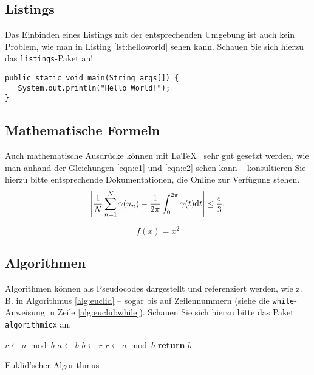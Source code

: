 \subsection{Listings}	

Das Einbinden eines Listings mit der entsprechenden Umgebung ist auch kein Problem, wie man in Listing \vref{lst:helloworld} sehen kann. Schauen Sie sich hierzu das \texttt{listings}-Paket an! 
		
		\newpage
		
		
\lstset{language=Java}
\begin{lstlisting}[caption={Hello World!}, label={lst:helloworld}]
public static void main(String args[]) {
   System.out.println("Hello World!");
}
\end{lstlisting}


\subsection{Mathematische Formeln}
Auch mathematische Ausdrücke können mit \LaTeX~ sehr gut gesetzt werden, wie man anhand der Gleichungen \vref{eqn:e1} und \vref{eqn:e2} sehen kann -- konsultieren Sie hierzu bitte entsprechende Dokumentationen, die Online zur Verfügung stehen.
\begin{equation}
\left|{1\over N}\sum_{n=1}^N \gamma(u_n)-{1\over 2\pi}\int_0^{2\pi}\gamma(t){\rm d}t\right| \le {\varepsilon\over 3}.\\
\label{eqn:e1}
\end{equation}

\begin{equation}
f(x)=x^2
\label{eqn:e2}
\end{equation}


\subsection{Algorithmen}
Algorithmen können als Pseudocodes dargestellt und referenziert werden, wie z.\,B. in Algorithmus \vref{alg:euclid} -- sogar bis auf Zeilennummern
(siehe die \texttt{while}-Anweisung in Zeile \vref{alg:euclid:while}). Schauen Sie sich hierzu bitte das Paket \texttt{algorithmicx} an.



\begin{algorithm}
\begin{algorithmic}[1]
   \State $r\gets a\bmod b$
    \label{alg:euclid:while}
      \State $a\gets b$
      \State $b\gets r$
      \State $r\gets a\bmod b$
   \EndWhile\label{euclidendwhile}
   \State \textbf{return} $b$
\EndProcedure
\end{algorithmic}
\caption{Euklid'scher Algorithmus}\label{alg:euclid}
\end{algorithm}

